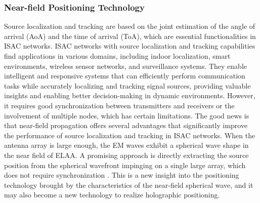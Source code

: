 \documentclass[10pt,journal,twocolumn,twoside]{IEEEtran} %
\begin{document}
\subsubsection{\textbf{Near-field Positioning Technology}}
 Source localization and tracking are based on the joint estimation of the angle of arrival (AoA) and the time of arrival (ToA), which are essential functionalities in ISAC networks. ISAC networks with source localization and tracking capabilities find applications in various domains, including indoor localization, smart environments, wireless sensor networks, and surveillance systems. They enable intelligent and responsive systems that can efficiently perform communication tasks while accurately localizing and tracking signal sources, providing valuable insights and enabling better decision-making in dynamic environments. However, it requires good synchronization between transmitters and receivers or the involvement of multiple nodes, which has certain limitations.  The good news is that near-field propagation offers several advantages that significantly improve the performance of source localization and tracking in ISAC networks. 
When the antenna array is large enough, the EM waves exhibit a spherical wave shape in the near field of ELAA. A promising approach is directly extracting the source position from the spherical wavefront impinging on a single large array, which does not require synchronization \cite{9508850}. This is a new insight into the positioning technology brought by the characteristics of the near-field spherical wave, and it may also become a new technology to realize holographic positioning.
\end{document}
